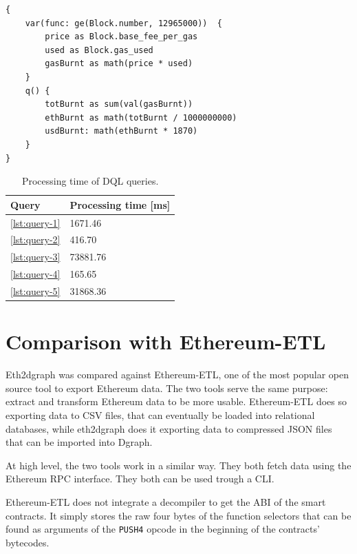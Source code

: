 \begin{lstlisting}[caption={Query to compute the ETH burnt after London upgrade.},label={lst:query-5},captionpos=b,numbers=none]
{
    var(func: ge(Block.number, 12965000))  {
        price as Block.base_fee_per_gas
        used as Block.gas_used
        gasBurnt as math(price * used)
    }
    q() {
        totBurnt as sum(val(gasBurnt))
        ethBurnt as math(totBurnt / 1000000000)
        usdBurnt: math(ethBurnt * 1870) 
    }
}
\end{lstlisting}

\begin{table}[H]
\centering
    \begin{threeparttable}
    \begin{tabular}{ m{3cm} m{5cm} } 
    \toprule
    \textbf{Query} & \textbf{Processing time [ms]}\\
    \midrule
    \cref{lst:query-1}   & 1671.46  \\ [1.2ex]
    \cref{lst:query-2}   & 416.70  \\ [1.2ex]
    \cref{lst:query-3}   & 73881.76  \\ [1.2ex]
    \cref{lst:query-4}   & 165.65  \\ [1.2ex]
    \cref{lst:query-5}   & 31868.36  \\ [1.2ex]
    \bottomrule
    \end{tabular}
    \end{threeparttable}
    \caption{Processing time of DQL queries. }
    \label{table:queries-results}
\end{table}
 
\section{Comparison with Ethereum-ETL}

Eth2dgraph was compared against Ethereum-ETL, one of the most popular open source tool to export Ethereum data. The two tools serve the same purpose: extract and transform Ethereum data to be more usable.
Ethereum-ETL does so exporting data to CSV files, that can eventually be loaded into relational databases, while eth2dgraph does it exporting data to compressed JSON files that can be imported into Dgraph. 

At high level, the two tools work in a similar way. They both fetch data using the Ethereum RPC interface. They both can be used trough a CLI.

Ethereum-ETL does not integrate a decompiler to get the ABI of the smart contracts. It simply stores the raw four bytes of the function selectors that can be found as arguments of the {\tt PUSH4} opcode in the beginning of the contracts' bytecodes. 

